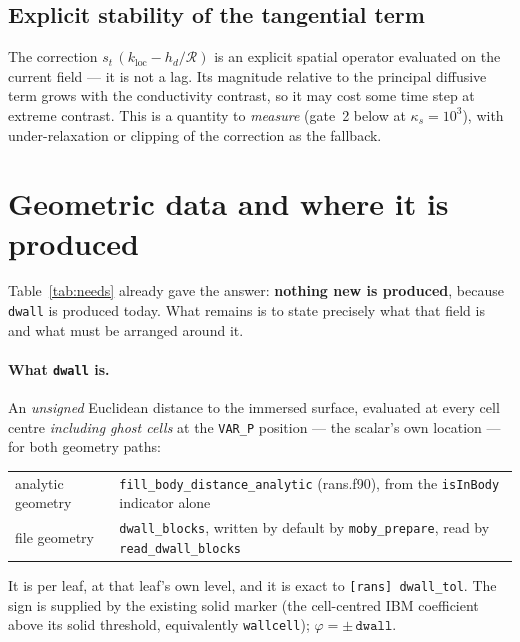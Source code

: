\documentclass[11pt,a4paper]{article}
\newcommand{\Rser}{\mathcal{R}}
\newcommand{\code}[1]{\texttt{#1}}
\begin{document}
\subsection{Explicit stability of the tangential term}

The correction $s_t\,(k_{\text{loc}}-h_d/\Rser)$ is an explicit spatial operator
evaluated on the current field --- it is not a lag. Its magnitude relative to the
principal diffusive term grows with the conductivity contrast, so it may cost
some time step at extreme contrast. This is a quantity to \emph{measure}
(gate~2 below at $\kappa_s=10^{3}$), with under-relaxation or clipping of the
correction as the fallback.

\section{Geometric data and where it is produced}

Table~\ref{tab:needs} already gave the answer: \textbf{nothing new is produced},
because \code{dwall} is produced today. What remains is to state precisely what
that field is and what must be arranged around it.

\paragraph{What \code{dwall} is.}
An \emph{unsigned} Euclidean distance to the immersed surface, evaluated at
every cell centre \emph{including ghost cells} at the \code{VAR\_P} position ---
the scalar's own location --- for both geometry paths:
\begin{center}
\begin{tabular}{@{}ll@{}}
\toprule
analytic geometry & \code{fill\_body\_distance\_analytic} (rans.f90), from the
                    \code{isInBody} indicator alone \\
file geometry     & \code{dwall\_blocks}, written by default by
                    \code{moby\_prepare}, read by \code{read\_dwall\_blocks} \\
\bottomrule
\end{tabular}
\end{center}
It is per leaf, at that leaf's own level, and it is exact to
\code{[rans] dwall\_tol}. The sign is supplied by the existing solid marker
(the cell-centred IBM coefficient above its solid threshold, equivalently
\code{wallcell}); $\varphi=\pm\,\code{dwall}$.
\end{document}
